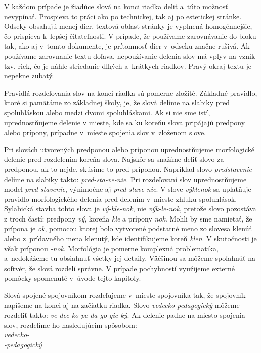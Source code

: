 V každom prípade je žiadúce slová na konci riadka deliť
a\ túto možnosť nevypínať.
Prospieva to práci ako po technickej,
tak aj po estetickej stránke.
Odseky obsahujú menej dier,
textová oblasť stránky je vyplnená homogénnejšie,
čo prispieva k~lepšej čitateľnosti.
V prípade, že používame zarovnávanie do bloku tak,
ako aj v~tomto dokumente,
je prítomnosť dier v~odseku značne rušivá.
Ak používame zarovnanie textu doľava,
nepoužívanie delenia slov má vplyv na vznik tzv. riek,
čo je náhle striedanie dlhých a~krátkych riadkov.
Pravý okraj textu je nepekne zubatý.

Pravidlá rozdeľovania slov na konci riadka sú pomerne zložité.
Základné pravidlo, ktoré si pamätáme zo základnej školy,
je, že slová delíme na slabiky pred spoluhláskou alebo medzi
dvomi spoluhláskami.
Ak si nie sme istí, uprednostňujeme delenie v mieste,
kde sa ku koreňu slova pripájajú predpony alebo prípony,
prípadne v~mieste spojenia slov v~zloženom slove.

Pri slovách utvorených predponou alebo príponou
uprednostňujeme morfologické delenie
pred rozdelením koreňa slova.
Najskôr sa snažíme deliť slovo za predponou,
ak to nejde, skúsime to pred príponou.
Napríklad slovo \emph{predstavenie}
delíme na slabiky takto: \emph{pred-sta-ve-nie}.
Pri rozdeľovaní slov uprednostňujeme model
\emph{pred-stavenie}, výnimočne aj \emph{pred-stave-nie}.
V slove \emph{výklenok} sa uplatňuje pravidlo morfologického
delenia pred delením v~mieste zhluku spoluhlások.
Sylabická stavba tohto slova je \emph{vý-kle-nok},
nie \emph{výk-le-nok},
pretože slovo pozostáva z troch častí: predpony \emph{vý},
koreňa \emph{kle} a prípony \emph{nok}.
Mohli by sme namietať, že prípona je \emph{ok},
pomocou ktorej bolo vytvorené podstatné meno zo slovesa
klenúť alebo z~prídavného mena klenutý,
kde identifikujeme koreň \emph{klen}.
V skutočnosti je však príponou \emph{-nok}.
Morfológia je pomerne komplexná problematika,
a~nedokážeme tu obsiahnuť všetky jej detaily.
Väčšinou sa môžeme spoľahnúť na softvér,
že slová rozdelí správne.
V prípade pochybností využijeme externé pomôcky spomenuté
v~úvode tejto kapitoly.

Slová spojené spojovníkom rozdeľujeme v~mieste spojovníka tak,
že spojovník napíšeme na konci aj na začiatku riadka.
Slovo \emph{vedecko-pedagogický} môžeme rozdeliť takto:
\emph{ve-dec-ko-pe-da-go-gic-ký}.
Ak delenie padne na miesto spojenia slov,
rozdelíme ho nasledujúcim spôsobom:\\
\indent\emph{vedecko-}\\
\indent\emph{-pedagogický}

